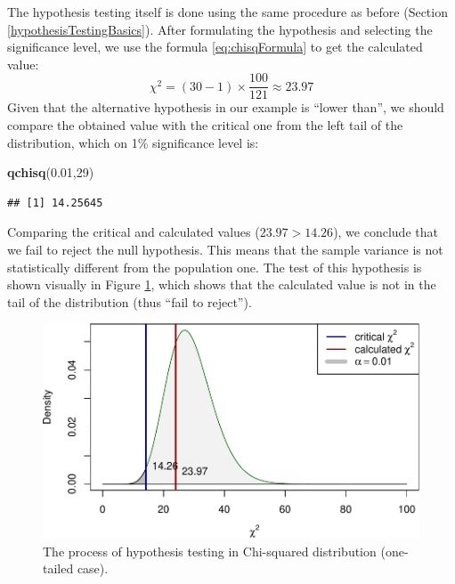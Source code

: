 \documentclass[
]{book}
\newenvironment{Shaded}{\begin{snugshade}}{\end{snugshade}}
\newcommand{\DecValTok}[1]{\textcolor[rgb]{0.00,0.00,0.81}{#1}}
\newcommand{\FloatTok}[1]{\textcolor[rgb]{0.00,0.00,0.81}{#1}}
\newcommand{\KeywordTok}[1]{\textcolor[rgb]{0.13,0.29,0.53}{\textbf{#1}}}
\newcommand{\NormalTok}[1]{#1}
\theoremstyle{definition}
\theoremstyle{definition}
\theoremstyle{definition}
\theoremstyle{definition}
\theoremstyle{remark}
\begin{document}
The hypothesis testing itself is done using the same procedure as before (Section \ref{hypothesisTestingBasics}). After formulating the hypothesis and selecting the significance level, we use the formula \eqref{eq:chisqFormula} to get the calculated value:
\begin{equation*}
    \chi^2 = (30-1) \times \frac{100}{121} \approx 23.97
\end{equation*}
Given that the alternative hypothesis in our example is ``lower than'', we should compare the obtained value with the critical one from the left tail of the distribution, which on 1\% significance level is:

\begin{Shaded}
\begin{Highlighting}[]
\KeywordTok{qchisq}\NormalTok{(}\FloatTok{0.01}\NormalTok{,}\DecValTok{29}\NormalTok{)}
\end{Highlighting}
\end{Shaded}

\begin{verbatim}
## [1] 14.25645
\end{verbatim}

Comparing the critical and calculated values (\(23.97>14.26\)), we conclude that we fail to reject the null hypothesis. This means that the sample variance is not statistically different from the population one. The test of this hypothesis is shown visually in Figure \ref{fig:hypothesisTestingChiSquared}, which shows that the calculated value is not in the tail of the distribution (thus ``fail to reject'').

\begin{figure}
\centering
\includegraphics{Svetunkov---Statistics-for-Business-Analytics_files/figure-latex/hypothesisTestingChiSquared-1.pdf}
\caption{\label{fig:hypothesisTestingChiSquared}The process of hypothesis testing in Chi-squared distribution (one-tailed case).}
\end{figure}
\end{document}
